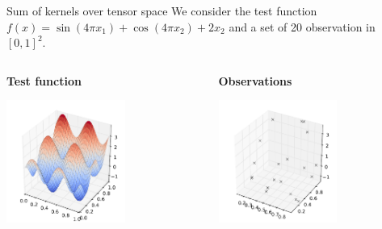 \begin{frame}{Sum of kernels over tensor space}
We consider the test function $f(x) = \sin( 4 \pi x_1) + \cos( 4 \pi x_2) + 2 x_2$ and a set of 20 observation in $[0,1]^2$. \\ \vspace{5mm}
\begin{columns}[c]
\begin{column}{5cm}
\textbf{Test function}
\begin{center}
\includegraphics[height=4cm]{3_gaussian_process_regression/figures/python/newfromold-productvssum2-predt}
\end{center}
\end{column}
\begin{column}{5cm}
\textbf{Observations}
\begin{center}
\includegraphics[height=4cm]{3_gaussian_process_regression/figures/python/newfromold-productvssum2-preddoe}
\end{center}
\end{column}
\end{columns}
\vspace{5mm}
\
\end{frame}

